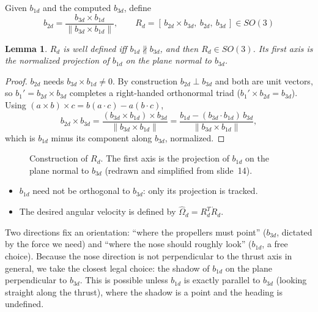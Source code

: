\documentclass[11pt,a4paper]{article}
\newcommand{\hatm}[1]{\widehat{#1}}          %
\theoremstyle{definition}
\theoremstyle{plain}
\newtheorem{lemma}[definition]{Lemma}
\theoremstyle{remark}
\begin{document}
Given $b_{1d}$ and the computed $b_{3d}$, define
\[
b_{2d}=\frac{b_{3d}\times b_{1d}}{\|b_{3d}\times b_{1d}\|},\qquad
\boxed{R_d=[\,b_{2d}\times b_{3d},\ b_{2d},\ b_{3d}\,]\in SO(3)}
\]

\begin{lemma}
$R_d$ is well defined iff $b_{1d}\nparallel b_{3d}$, and then $R_d\in SO(3)$. Its first axis is the normalized \emph{projection} of $b_{1d}$ on the plane normal to $b_{3d}$.
\end{lemma}
\begin{proof}
$b_{2d}$ needs $b_{3d}\times b_{1d}\ne0$. By construction $b_{2d}\perp b_{3d}$ and both are unit vectors, so $b_1'=b_{2d}\times b_{3d}$ completes a right-handed orthonormal triad ($b_1'\times b_{2d}=b_{3d}$). Using $(a\times b)\times c=b(a\cdot c)-a(b\cdot c)$,
\[
b_{2d}\times b_{3d}=\frac{(b_{3d}\times b_{1d})\times b_{3d}}{\|b_{3d}\times b_{1d}\|}=\frac{b_{1d}-(b_{3d}\cdot b_{1d})\,b_{3d}}{\|b_{3d}\times b_{1d}\|},
\]
which is $b_{1d}$ minus its component along $b_{3d}$, normalized.
\end{proof}

\begin{figure}[h]
\centering
{}
\caption{Construction of $R_d$. The first axis is the projection of $b_{1d}$ on the plane normal to $b_{3d}$ (redrawn and simplified from slide~14).}
\end{figure}

\begin{itemize}
  \item $b_{1d}$ need not be orthogonal to $b_{3d}$: only its projection is tracked.
  \item The desired angular velocity is defined by $\hatm\Omega_d=R_d^T\dot R_d$.
\end{itemize}

\begin{intuition}
Two directions fix an orientation: ``where the propellers must point'' ($b_{3d}$, dictated by the force we need) and ``where the nose should roughly look'' ($b_{1d}$, a free choice). Because the nose direction is not perpendicular to the thrust axis in general, we take the closest legal choice: the shadow of $b_{1d}$ on the plane perpendicular to $b_{3d}$. This is possible unless $b_{1d}$ is exactly parallel to $b_{3d}$ (looking straight along the thrust), where the shadow is a point and the heading is undefined.
\end{intuition}
\end{document}
